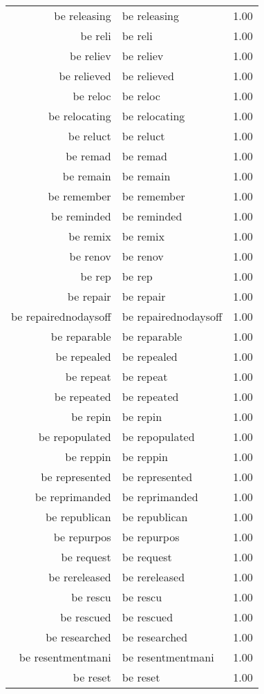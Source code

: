 \begin{table}[ht]
\begin{tabular}{rlr}
  be releasing & be releasing & 1.00 \\ 
  be reli & be reli & 1.00 \\ 
  be reliev & be reliev & 1.00 \\ 
  be relieved & be relieved & 1.00 \\ 
  be reloc & be reloc & 1.00 \\ 
  be relocating & be relocating & 1.00 \\ 
  be reluct & be reluct & 1.00 \\ 
  be remad & be remad & 1.00 \\ 
  be remain & be remain & 1.00 \\ 
  be remember & be remember & 1.00 \\ 
  be reminded & be reminded & 1.00 \\ 
  be remix & be remix & 1.00 \\ 
  be renov & be renov & 1.00 \\ 
  be rep & be rep & 1.00 \\ 
  be repair & be repair & 1.00 \\ 
  be repairednodaysoff & be repairednodaysoff & 1.00 \\ 
  be reparable & be reparable & 1.00 \\ 
  be repealed & be repealed & 1.00 \\ 
  be repeat & be repeat & 1.00 \\ 
  be repeated & be repeated & 1.00 \\ 
  be repin & be repin & 1.00 \\ 
  be repopulated & be repopulated & 1.00 \\ 
  be reppin & be reppin & 1.00 \\ 
  be represented & be represented & 1.00 \\ 
  be reprimanded & be reprimanded & 1.00 \\ 
  be republican & be republican & 1.00 \\ 
  be repurpos & be repurpos & 1.00 \\ 
  be request & be request & 1.00 \\ 
  be rereleased & be rereleased & 1.00 \\ 
  be rescu & be rescu & 1.00 \\ 
  be rescued & be rescued & 1.00 \\ 
  be researched & be researched & 1.00 \\ 
  be resentmentmani & be resentmentmani & 1.00 \\ 
  be reset & be reset & 1.00 \\ 

\end{tabular}
\end{table}

